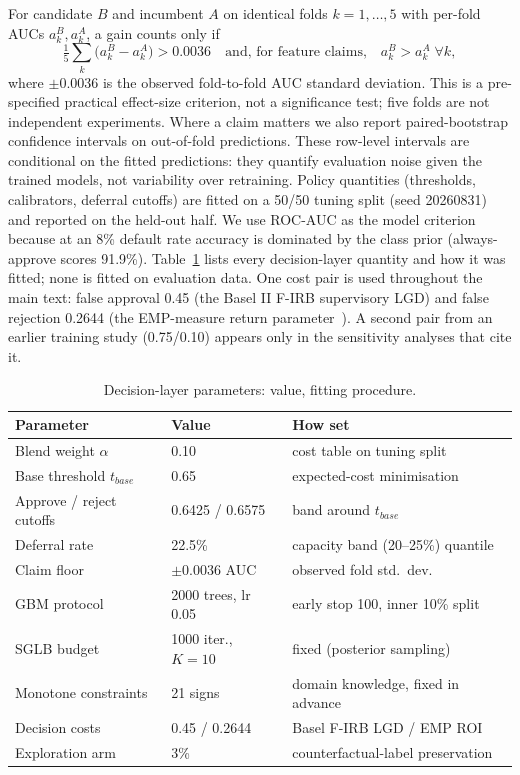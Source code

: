 \documentclass[conference]{IEEEtran}
\begin{document}
For candidate $B$ and incumbent $A$ on identical folds $k = 1,\dots,5$ with
per-fold AUCs $a_k^{B}, a_k^{A}$, a gain counts only if
\begin{equation}
\tfrac{1}{5}\textstyle\sum_k \big(a_k^{B}-a_k^{A}\big) > 0.0036
\quad\text{and, for feature claims,}\quad a_k^{B} > a_k^{A}\;\forall k ,
\label{eq:claim}
\end{equation}
where $\pm0.0036$ is the observed fold-to-fold AUC standard deviation. This
is a pre-specified practical effect-size criterion, not a significance
test; five folds are not independent experiments. Where a claim matters we
also report paired-bootstrap confidence intervals on out-of-fold
predictions. These row-level intervals are conditional on the fitted
predictions: they quantify evaluation noise given the trained models, not
variability over retraining. Policy quantities (thresholds, calibrators,
deferral cutoffs) are fitted on a 50/50 tuning split (seed 20260831) and
reported on the held-out half. We use ROC-AUC as the model criterion
because at an 8\% default rate accuracy is dominated by the class prior
(always-approve scores 91.9\%). Table~\ref{tab:params} lists every
decision-layer quantity and how it was fitted; none is fitted on evaluation
data. One cost pair is used throughout the main text: false approval 0.45
(the Basel II F-IRB supervisory LGD) and false rejection 0.2644 (the
EMP-measure return parameter~\cite{verbraken2014}). A second pair from an
earlier training study (0.75/0.10) appears only in the sensitivity analyses
that cite it.

\begin{table}[t]
\centering
\caption{Decision-layer parameters: value, fitting procedure.}
\label{tab:params}
\begin{tabular}{@{}l l l@{}}
\toprule
\textbf{Parameter} & \textbf{Value} & \textbf{How set} \\
\midrule
Blend weight $\alpha$ & 0.10 & cost table on tuning split \\
Base threshold $t_{base}$ & 0.65 & expected-cost minimisation \\
Approve / reject cutoffs & 0.6425 / 0.6575 & band around $t_{base}$ \\
Deferral rate & 22.5\% & capacity band (20--25\%) quantile \\
Claim floor & $\pm0.0036$ AUC & observed fold std.\ dev. \\
GBM protocol & 2000 trees, lr 0.05 & early stop 100, inner 10\% split \\
SGLB budget & 1000 iter., $K{=}10$ & fixed (posterior sampling) \\
Monotone constraints & 21 signs & domain knowledge, fixed in advance \\
Decision costs & 0.45 / 0.2644 & Basel F-IRB LGD / EMP ROI \\
Exploration arm & 3\% & counterfactual-label preservation \\
\bottomrule
\end{tabular}
\end{table}
\end{document}
